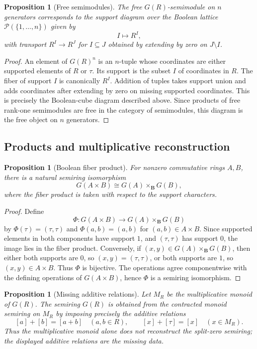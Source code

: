 \documentclass[11pt]{article}
\newcommand{\B}{\mathbf B}
\theoremstyle{plain}
\newtheorem{proposition}[theorem]{Proposition}
\theoremstyle{definition}
\numberwithin{equation}{section}
\begin{document}
\begin{proposition}[Free semimodules]
The free \(G(R)\)-semimodule on \(n\) generators corresponds to the support diagram over the Boolean lattice \(\mathcal P(\{1,\ldots,n\})\) given by
\[
 I\longmapsto R^I,
\]
with transport \(R^I\to R^J\) for \(I\subseteq J\) obtained by extending by zero on \(J\setminus I\).
\end{proposition}

\begin{proof}
An element of \(G(R)^n\) is an \(n\)-tuple whose coordinates are either supported elements of \(R\) or \(\tau\).  Its support is the subset \(I\) of coordinates in \(R\).  The fiber of support \(I\) is canonically \(R^I\).  Addition of tuples takes support union and adds coordinates after extending by zero on missing supported coordinates.  This is precisely the Boolean-cube diagram described above.  Since products of free rank-one semimodules are free in the category of semimodules, this diagram is the free object on \(n\) generators.
\end{proof}

\subsection{Products and multiplicative reconstruction}

\begin{proposition}[Boolean fiber product]\label{prop:product}
For nonzero commutative rings \(A,B\), there is a natural semiring isomorphism
\[
 G(A\times B)\cong G(A)\times_{\B}G(B),
\]
where the fiber product is taken with respect to the support characters.
\end{proposition}

\begin{proof}
Define
\[
 \Phi:G(A\times B)\to G(A)\times_\B G(B)
\]
by \(\Phi(\tau)=(\tau,\tau)\) and \(\Phi(a,b)=(a,b)\) for \((a,b)\in A\times B\).  Since supported elements in both components have support \(1\), and \((\tau,\tau)\) has support \(0\), the image lies in the fiber product.  Conversely, if \((x,y)\in G(A)\times_\B G(B)\), then either both supports are \(0\), so \((x,y)=(\tau,\tau)\), or both supports are \(1\), so \((x,y)\in A\times B\).  Thus \(\Phi\) is bijective.  The operations agree componentwise with the defining operations of \(G(A\times B)\), hence \(\Phi\) is a semiring isomorphism.
\end{proof}

\begin{proposition}[Missing additive relations]
Let \(M_R\) be the multiplicative monoid of \(G(R)\).  The semiring \(G(R)\) is obtained from the contracted monoid semiring on \(M_R\) by imposing precisely the additive relations
\[
 [a]+[b]=[a+b]\quad(a,b\in R),
 \qquad
 [x]+[\tau]=[x]\quad(x\in M_R).
\]
Thus the multiplicative monoid alone does not reconstruct the split-zero semiring; the displayed additive relations are the missing data.
\end{proposition}
\end{document}
